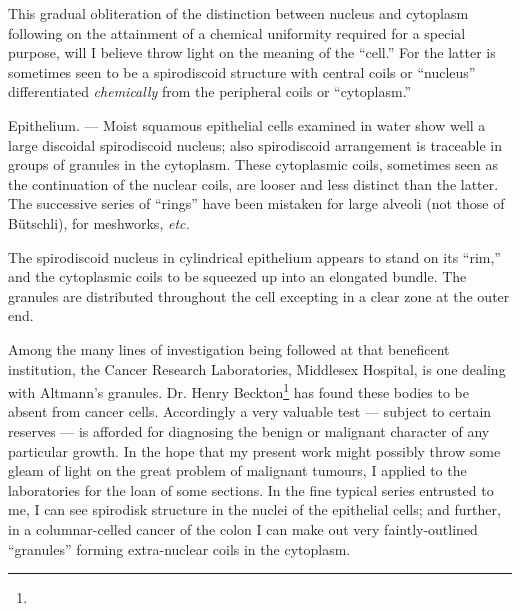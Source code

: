 \documentclass[a4paper, 12pt, oneside]{article}
\begin{document}
This gradual obliteration of the distinction between nucleus and cytoplasm following on the attainment of a chemical uniformity required for a special purpose, will I believe throw light on the meaning of the ``cell.'' For the latter is sometimes seen to be a spirodiscoid structure with central coils or ``nucleus'' differentiated \emph{chemically} from the peripheral coils or ``cytoplasm.''

Epithelium. --- Moist squamous epithelial cells examined in water show well a large discoidal spirodiscoid nucleus; also spirodiscoid arrangement is traceable in groups of granules in the cytoplasm. These cytoplasmic coils, sometimes seen as the continuation of the nuclear coils, are looser and less distinct than the latter. The successive series of ``rings'' have been mistaken for large alveoli (not those of Bütschli), for meshworks, \emph{etc.}

The spirodiscoid nucleus in cylindrical epithelium appears to stand on its ``rim,'' and the cytoplasmic coils to be squeezed up into an elongated bundle. The granules are distributed throughout the cell excepting in a clear zone at the outer end.

Among the many lines of investigation being followed at that beneficent institution, the Cancer Research Laboratories, Middlesex Hospital, is one dealing with Altmann's granules. Dr. Henry Beckton\footnote{} has found these bodies to be absent from cancer cells. Accordingly a very valuable test --- subject to certain reserves --- is afforded for diagnosing the benign or malignant character of any particular growth. In the hope that my present work might possibly throw some gleam of light on the great problem of malignant tumours, I applied to the laboratories for the loan of some sections. In the fine typical series entrusted to me, I can see spirodisk structure in the nuclei of the epithelial cells; and further, in a columnar-celled cancer of the colon I can make out very faintly-outlined ``granules'' forming extra-nuclear coils in the cytoplasm.
\end{document}
